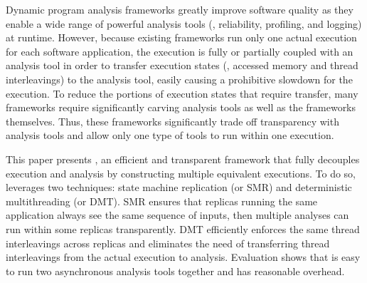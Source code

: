 
Dynamic program analysis frameworks greatly improve software quality as
they enable a wide range of powerful analysis tools (\eg, reliability,
profiling, and logging) at runtime. However, because existing frameworks run
only one actual execution for each software application, the execution is fully
or partially coupled with an analysis tool in order to transfer execution states
(\eg, accessed memory and thread interleavings) to the analysis tool, easily
causing a prohibitive slowdown for the execution. To reduce the portions of
execution states that require transfer, many frameworks require significantly
carving analysis tools as well as the frameworks themselves. Thus, these
frameworks significantly trade off transparency with analysis tools and allow
only one type of tools to run within one execution.


This paper presents \xxx, an efficient and transparent framework that fully 
decouples execution and analysis by constructing multiple equivalent 
executions. To do so, \xxx leverages two techniques: state machine replication 
(or SMR) and deterministic multithreading (or DMT). SMR ensures that replicas 
running the same application always see the same sequence of inputs, then 
multiple analyses can run within some replicas transparently. DMT efficiently
enforces the same thread interleavings across replicas and eliminates the need
of transferring thread interleavings from the actual execution to analysis.
Evaluation shows that \xxx is easy to run two asynchronous analysis tools together and has reasonable overhead.
